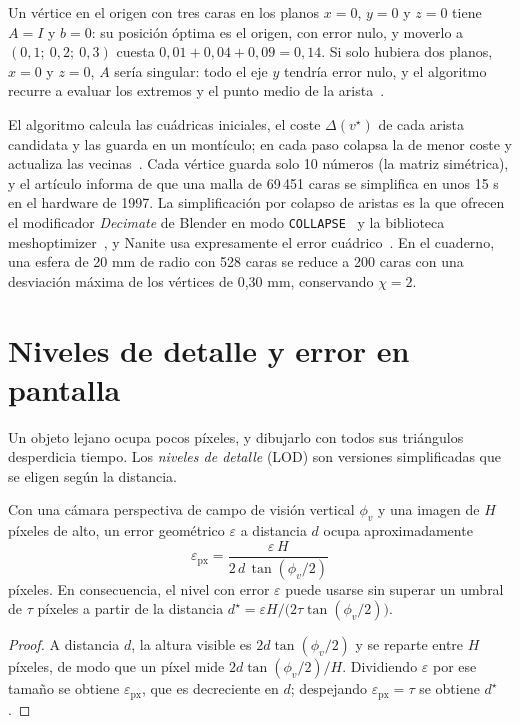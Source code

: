 \begin{ejemplo}\label{ej:esquina}
Un vértice en el origen con tres caras en los planos $x=0$, $y=0$ y $z=0$ tiene $A=I$ y $b=0$: su posición óptima es el origen, con error nulo, y moverlo a $(0{,}1;\ 0{,}2;\ 0{,}3)$ cuesta $0{,}01+0{,}04+0{,}09=0{,}14$. Si solo hubiera dos planos, $x=0$ y $z=0$, $A$ sería singular: todo el eje $y$ tendría error nulo, y el algoritmo recurre a evaluar los extremos y el punto medio de la arista~\cite[§4]{garland}.
\end{ejemplo}

El algoritmo calcula las cuádricas iniciales, el coste $\Delta(v^\star)$ de cada arista candidata y las guarda en un montículo; en cada paso colapsa la de menor coste y actualiza las vecinas~\cite[§4.1]{garland}. Cada vértice guarda solo 10 números (la matriz simétrica), y el artículo informa de que una malla de 69\,451 caras se simplifica en unos 15 s en el hardware de 1997. La simplificación por colapso de aristas es la que ofrecen el modificador \emph{Decimate} de Blender en modo \texttt{COLLAPSE}~\cite{blenderapi} y la biblioteca meshoptimizer~\cite{meshopt}, y Nanite usa expresamente el error cuádrico~\cite{nanite}. En el cuaderno, una esfera de 20 mm de radio con 528 caras se reduce a 200 caras con una desviación máxima de los vértices de 0,30 mm, conservando $\chi=2$.

\section{Niveles de detalle y error en pantalla}

Un objeto lejano ocupa pocos píxeles, y dibujarlo con todos sus triángulos desperdicia tiempo. Los \emph{niveles de detalle} (LOD) son versiones simplificadas que se eligen según la distancia.

\begin{proposicion}\label{prop:error-px}
Con una cámara perspectiva de campo de visión vertical $\phi_v$ y una imagen de $H$ píxeles de alto, un error geométrico $\varepsilon$ a distancia $d$ ocupa aproximadamente
\[
\varepsilon_{\text{px}}=\frac{\varepsilon\,H}{2\,d\,\tan(\phi_v/2)}
\]
píxeles. En consecuencia, el nivel con error $\varepsilon$ puede usarse sin superar un umbral de $\tau$ píxeles a partir de la distancia $d^\star=\varepsilon H/\bigl(2\tau\tan(\phi_v/2)\bigr)$.
\end{proposicion}

\begin{proof}
A distancia $d$, la altura visible es $2d\tan(\phi_v/2)$ y se reparte entre $H$ píxeles, de modo que un píxel mide $2d\tan(\phi_v/2)/H$. Dividiendo $\varepsilon$ por ese tamaño se obtiene $\varepsilon_{\text{px}}$, que es decreciente en $d$; despejando $\varepsilon_{\text{px}}=\tau$ se obtiene $d^\star$.
\end{proof}

